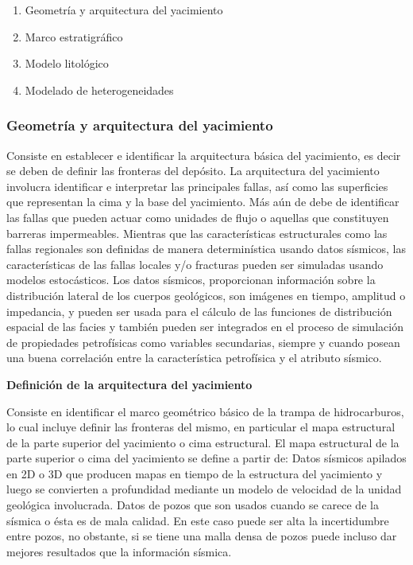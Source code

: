 \begin{enumerate}
	\item Geometr\'ia y arquitectura del yacimiento
	\item Marco estratigr\'afico
	\item Modelo litol\'ogico
	\item Modelado de heterogeneidades
\end{enumerate}

\subsubsection{Geometr\'ia y arquitectura del yacimiento}
Consiste en establecer e identificar la arquitectura b\'asica del yacimiento, es decir se deben de definir las fronteras del dep\'osito. La arquitectura del yacimiento involucra identificar e interpretar las principales fallas, as\'i como las superficies que representan la cima y la base del yacimiento. M\'as a\'un de debe de identificar las fallas que pueden actuar como unidades de flujo o aquellas que constituyen barreras impermeables. Mientras que las caracter\'isticas estructurales como las fallas regionales son definidas de manera determin\'istica usando datos s\'ismicos, las caracter\'isticas de las fallas locales y/o fracturas pueden ser simuladas usando modelos estoc\'asticos. Los datos s\'ismicos, proporcionan informaci\'on sobre la distribuci\'on lateral de los cuerpos geol\'ogicos, son im\'agenes en tiempo, amplitud o impedancia, y pueden ser usada para el c\'alculo de las funciones de distribuci\'on espacial de las facies y tambi\'en pueden ser integrados en el proceso de simulaci\'on de propiedades petrof\'isicas como variables secundarias, siempre y cuando posean una buena correlaci\'on entre la caracter\'istica petrof\'isica y el atributo s\'ismico.

\textbf{Definici\'on de la arquitectura del yacimiento}

Consiste en identificar el marco geom\'etrico b\'asico de la trampa de hidrocarburos, lo cual incluye definir las fronteras del mismo, en particular el mapa estructural de la parte superior del yacimiento o cima estructural.
El mapa estructural de la parte superior o cima del yacimiento se define a partir de:
Datos s\'ismicos apilados en 2D o 3D que producen mapas en tiempo de la estructura del yacimiento y luego se convierten a profundidad mediante un modelo de velocidad de la unidad geol\'ogica involucrada.
Datos de pozos que son usados cuando se carece de la s\'ismica o \'esta es de mala calidad. En este caso puede ser alta la incertidumbre entre pozos, no obstante, si se tiene una malla densa de pozos puede incluso dar mejores resultados que la informaci\'on s\'ismica.

